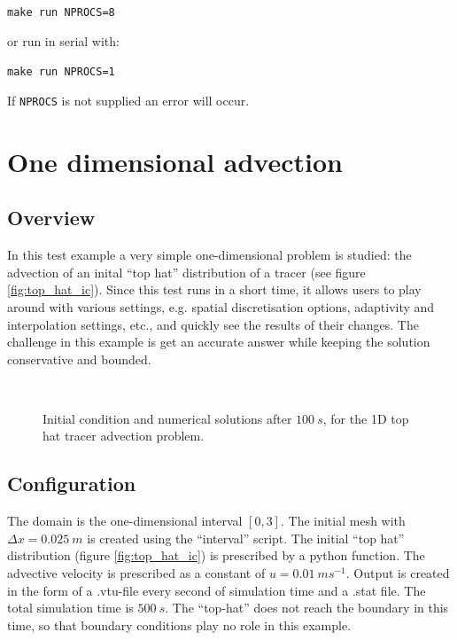 \hspace{0.05\textwidth}\texttt{make run NPROCS=8}

or run in serial with:

\hspace{0.05\textwidth}\texttt{make run NPROCS=1}

If \texttt{NPROCS} is not supplied an error will occur.


\section{One dimensional advection}
\label{sec:oned_advection}
\subsection{Overview}
In this test example a very simple one-dimensional problem is 
studied: the advection of an inital ``top hat'' distribution 
of a tracer (see figure \ref{fig:top_hat_ic}). Since this test runs in a  
short time, it allows users to play around with various
settings, e.g. spatial discretisation options, adaptivity 
and interpolation settings, etc., and quickly see the results
of their changes. The challenge in this example is get an accurate
answer while keeping the solution conservative and bounded.

\begin{figure}
  \centering
    \label{fig:top_hat_ic}
    \label{fig:top_hat_cg_example} \\
    \label{fig:top_hat_dg}
    \label{fig:top_hat_cv}
  \caption{Initial condition and numerical solutions after $100~s$, for the 1D top hat tracer advection problem.}
\end{figure}

\subsection{Configuration}
The domain is the one-dimensional interval $[0,3]$. The initial 
mesh with $\Delta x=0.025~m$ is created using the ``interval'' 
script. The initial ``top hat'' distribution (figure \ref{fig:top_hat_ic}) is 
prescribed by a python function. The advective velocity is 
prescribed as a constant of $u=0.01~ms^{-1}$. Output is created
in the form of a .vtu-file every second of simulation time
and a .stat file. The total simulation time is $500~s$. 
The ``top-hat'' does not reach the boundary in this time, so that
boundary conditions play no role in this example.

